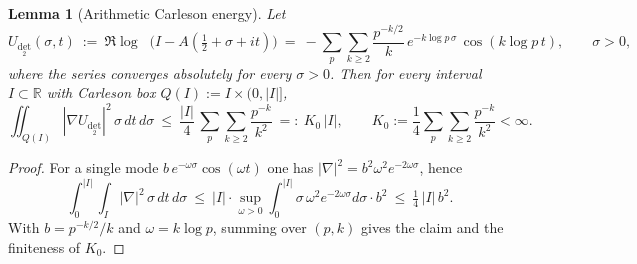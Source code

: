 \documentclass[11pt]{amsart}
\newtheorem{lemma}[theorem]{Lemma}
\theoremstyle{definition}
\theoremstyle{remark}
\newcommand{\R}{\mathbb{R}}
\DeclareMathOperator{\dettwo}{det_2}
\begin{document}
\begin{lemma}[Arithmetic Carleson energy]\label{lem:carleson-arith}
Let
\[
 U_{\det_2}(\sigma,t)\ :=\ \Re\log\dettwo\!\Big(I-A(\tfrac12+\sigma+it)\Big)
 \ =\ -\sum_{p}\sum_{k\ge 2}\frac{p^{-k/2}}{k}\,e^{-k\log p\,\sigma}\,\cos(k\log p\,t),\qquad \sigma>0,
\]
where the series converges absolutely for every \(\sigma>0\).
Then for every interval \(I\subset\R\) with Carleson box \(Q(I):=I\times(0,|I|]\),
\[
 \iint_{Q(I)} |\nabla U_{\det_2}|^2\,\sigma\,dt\,d\sigma\ \le\ \frac{|I|}{4}\,\sum_{p}\sum_{k\ge 2}\frac{p^{-k}}{k^2}
 \ =:\ K_0\,|I|,\qquad K_0:=\frac{1}{4}\sum_{p}\sum_{k\ge 2}\frac{p^{-k}}{k^2}<\infty.
\]
\end{lemma}
\begin{proof}
For a single mode \(b\,e^{-\omega\sigma}\cos(\omega t)\) one has \(|\nabla|^2=b^2\omega^2e^{-2\omega\sigma}\), hence
\[
 \int_0^{|I|}\!\int_I |\nabla|^2\,\sigma\,dt\,d\sigma
 \ \le\ |I|\cdot\sup_{\omega>0}\int_0^{|I|}\sigma\,\omega^2e^{-2\omega\sigma}d\sigma\cdot b^2
 \ \le\ \tfrac14\,|I|\,b^2.
\]
With \(b=p^{-k/2}/k\) and \(\omega=k\log p\), summing over \((p,k)\) gives the claim and the finiteness of \(K_0\).
\end{proof}
\end{document}
